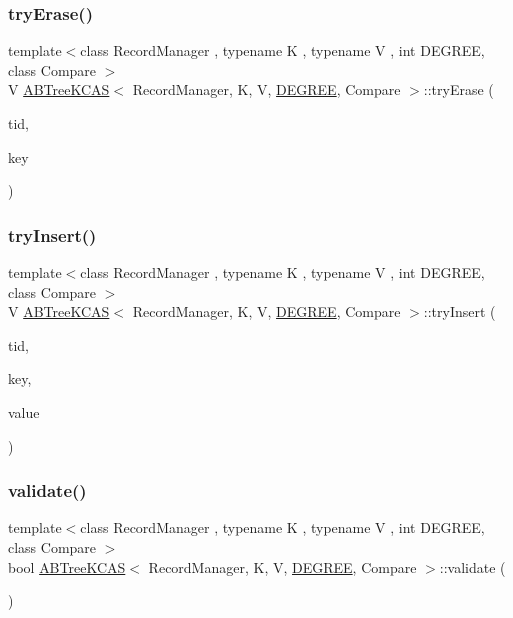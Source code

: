 \subsubsection{\texorpdfstring{try\+Erase()}{tryErase()}}
{\footnotesize\ttfamily template$<$class Record\+Manager , typename K , typename V , int D\+E\+G\+R\+EE, class Compare $>$ \\
V \hyperlink{classABTreeKCAS}{A\+B\+Tree\+K\+C\+AS}$<$ Record\+Manager, K, V, \hyperlink{brown__sigouin__abtree__kcas_2adapter_8h_a5d88b17d70c985f2f2b8e987037fd6dd}{D\+E\+G\+R\+EE}, Compare $>$\+::try\+Erase (\begin{DoxyParamCaption}\item[{const int}]{tid,  }\item[{const K \&}]{key }\end{DoxyParamCaption})}

\mbox{\label{classABTreeKCAS_a094f81e654a86f774925b0e9d268a778}} 
\subsubsection{\texorpdfstring{try\+Insert()}{tryInsert()}}
{\footnotesize\ttfamily template$<$class Record\+Manager , typename K , typename V , int D\+E\+G\+R\+EE, class Compare $>$ \\
V \hyperlink{classABTreeKCAS}{A\+B\+Tree\+K\+C\+AS}$<$ Record\+Manager, K, V, \hyperlink{brown__sigouin__abtree__kcas_2adapter_8h_a5d88b17d70c985f2f2b8e987037fd6dd}{D\+E\+G\+R\+EE}, Compare $>$\+::try\+Insert (\begin{DoxyParamCaption}\item[{const int}]{tid,  }\item[{const K \&}]{key,  }\item[{const V \&}]{value }\end{DoxyParamCaption})}

\mbox{\label{classABTreeKCAS_a78a291f570e7f05dd4890722fd1861e1}} 
\subsubsection{\texorpdfstring{validate()}{validate()}}
{\footnotesize\ttfamily template$<$class Record\+Manager , typename K , typename V , int D\+E\+G\+R\+EE, class Compare $>$ \\
bool \hyperlink{classABTreeKCAS}{A\+B\+Tree\+K\+C\+AS}$<$ Record\+Manager, K, V, \hyperlink{brown__sigouin__abtree__kcas_2adapter_8h_a5d88b17d70c985f2f2b8e987037fd6dd}{D\+E\+G\+R\+EE}, Compare $>$\+::validate (\begin{DoxyParamCaption}{ }\end{DoxyParamCaption})}



